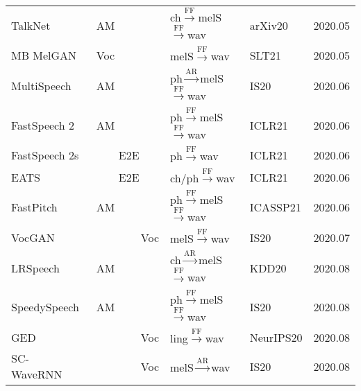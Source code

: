 \documentclass{article}
\begin{document}
\begin{center}
\begin{longtable}{l | l | l | l | l }
		TalkNet~\cite{beliaev2020talknet}                  & AM       &  {\color{blue}ch}$\stackrel{\text{FF}}{\longrightarrow}${\color{red}melS}$\stackrel{\text{FF}}{\longrightarrow}$wav             &arXiv20& 2020.05     \\
		MB MelGAN~\cite{yang2020multi}      & Voc      & {\color{red}melS}$\stackrel{\text{FF}}{\longrightarrow}$wav   & SLT21 & 2020.05        \\
		MultiSpeech~\cite{chen2020multispeech}         & AM & {\color{blue}ph}$\stackrel{\text{AR}}{\longrightarrow}${\color{red}melS}$\stackrel{\text{FF}}{\longrightarrow}$wav              & IS20 & 2020.06        \\
		FastSpeech 2~\cite{ren2021fastspeech}         & AM & {\color{blue}ph}$\stackrel{\text{FF}}{\longrightarrow}${\color{red}melS}$\stackrel{\text{FF}}{\longrightarrow}$wav              & ICLR21& 2020.06        \\
		FastSpeech 2s~\cite{ren2021fastspeech}  & ~~~~E2E &{\color{blue}ph}$\stackrel{\text{FF}}{\longrightarrow}$wav   & ICLR21 & 2020.06         \\
		EATS~\cite{donahue2020end}  & ~~~~E2E & {\color{blue}ch/ph}$\stackrel{\text{FF}}{\longrightarrow}$wav   & ICLR21 & 2020.06  \\
		FastPitch~\cite{lancucki2020fastpitch}   & AM & {\color{blue}ph}$\stackrel{\text{FF}}{\longrightarrow}${\color{red}melS}$\stackrel{\text{FF}}{\longrightarrow}$wav               &  ICASSP21 & 2020.06        \\
		VocGAN~\cite{yang2020vocgan}                 & ~~~~~~~~Voc      & {\color{red}melS}$\stackrel{\text{FF}}{\longrightarrow}$wav          &IS20& 2020.07         \\
		LRSpeech~\cite{xu2020lrspeech}           & AM       &  {\color{blue}ch}$\stackrel{\text{AR}}{\longrightarrow}${\color{red}melS}$\stackrel{\text{FF}}{\longrightarrow}$wav             &KDD20& 2020.08         \\
		SpeedySpeech~\cite{vainer2020speedyspeech}           & AM       &  {\color{blue}ph}$\stackrel{\text{FF}}{\longrightarrow}${\color{red}melS}$\stackrel{\text{FF}}{\longrightarrow}$wav             &IS20& 2020.08         \\
		GED~\cite{gritsenko2020spectral}               & ~~~~~~~~Voc      & {\color{green}ling}$\stackrel{\text{FF}}{\longrightarrow}$wav          & NeurIPS20& 2020.08         \\
		SC-WaveRNN~\cite{paul2020speaker} &  ~~~~~~~~Voc  & {\color{red}melS}$\stackrel{\text{AR}}{\longrightarrow}$wav  & IS20 & 2020.08 \\

\end{longtable}
\end{center}
\end{document}
